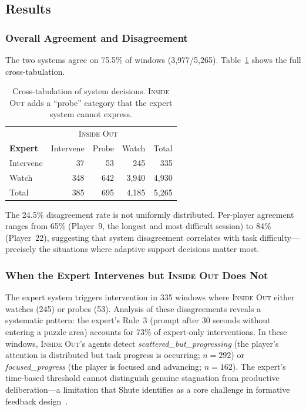 \subsection{Results}

\subsubsection{Overall Agreement and Disagreement}

The two systems agree on 75.5\% of windows (3,977/5,265). Table~\ref{tab:crosstab} shows the full cross-tabulation.

\begin{table}[t]
\centering
\caption{Cross-tabulation of system decisions. \textsc{Inside Out} adds a ``probe'' category that the expert system cannot express.}
\label{tab:crosstab}
\small
\begin{tabular}{lrrr|r}
\toprule
 & \multicolumn{3}{c}{\textsc{Inside Out}} & \\
\textbf{Expert} & Intervene & Probe & Watch & Total \\
\midrule
Intervene & 37 & 53 & 245 & 335 \\
Watch     & 348 & 642 & 3{,}940 & 4{,}930 \\
\midrule
Total     & 385 & 695 & 4{,}185 & 5{,}265 \\
\bottomrule
\end{tabular}
\end{table}

The 24.5\% disagreement rate is not uniformly distributed. Per-player agreement ranges from 65\% (Player~9, the longest and most difficult session) to 84\% (Player~22), suggesting that system disagreement correlates with task difficulty---precisely the situations where adaptive support decisions matter most.

\subsubsection{When the Expert Intervenes but \textsc{Inside Out} Does Not}

The expert system triggers intervention in 335 windows where \textsc{Inside Out} either watches (245) or probes (53). Analysis of these disagreements reveals a systematic pattern: the expert's Rule~3 (prompt after 30 seconds without entering a puzzle area) accounts for 73\% of expert-only interventions. In these windows, \textsc{Inside Out}'s agents detect \emph{scattered\_but\_progressing} (the player's attention is distributed but task progress is occurring; $n = 292$) or \emph{focused\_progress} (the player is focused and advancing; $n = 162$). The expert's time-based threshold cannot distinguish genuine stagnation from productive deliberation---a limitation that Shute identifies as a core challenge in formative feedback design~\cite{shute2008adaptive}.

